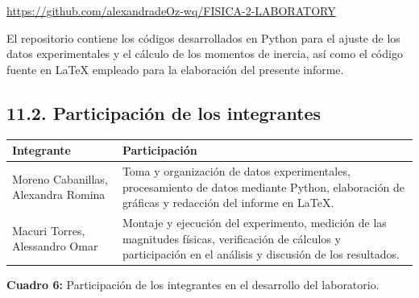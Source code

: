 \documentclass[11pt,a4paper]{article}
\begin{document}
\begin{center}
\url{https://github.com/alexandradeOz-wq/FISICA-2-LABORATORY}
\end{center}

El repositorio contiene los códigos desarrollados en Python para el
ajuste de los datos experimentales y el cálculo de los momentos de
inercia, así como el código fuente en \LaTeX{} empleado para la
elaboración del presente informe.


\subsection*{11.2. Participación de los integrantes}

\begin{table}[h!]
\centering
\renewcommand{\arraystretch}{1.3}
\begin{tabular}{p{} p{}}
\hline
\textbf{Integrante} & \textbf{Participación} \\
\hline

Moreno Cabanillas, Alexandra Romina &
Toma y organización de datos experimentales, procesamiento de datos
mediante Python, elaboración de gráficas y redacción del informe en
\LaTeX{}. \\

Macuri Torres, Alessandro Omar &
Montaje y ejecución del experimento, medición de las magnitudes físicas,
verificación de cálculos y participación en el análisis y discusión de
los resultados. \\

\hline
\end{tabular}

\vspace{0.2cm}
\textbf{Cuadro 6:} Participación de los integrantes en el desarrollo
del laboratorio.
\end{table}
\end{document}
